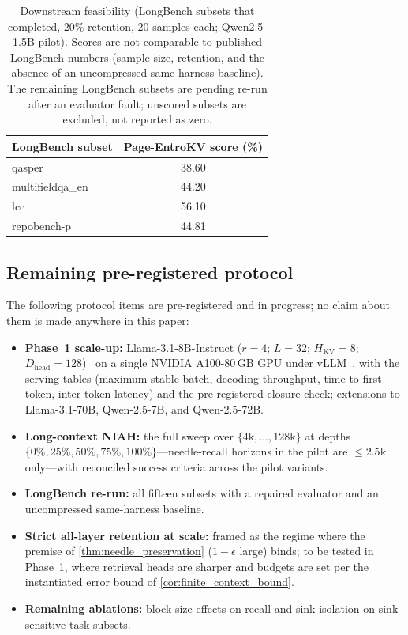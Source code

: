 \documentclass[final,5p,times,twocolumn]{elsarticle}
\theoremstyle{definition}
\theoremstyle{remark}
\newcommand{\method}{Page-EntroKV}
\newcommand{\HKV}{H_{\mathrm{KV}}}
\newcommand{\Dhead}{D_{\mathrm{head}}}
\begin{document}
\begin{table}[t]
\centering\small
\caption{Downstream feasibility (LongBench subsets that completed,
 $20\%$ retention, 20 samples each; Qwen2.5-1.5B pilot).
 Scores are not comparable to published LongBench numbers (sample size,
 retention, and the absence of an uncompressed same-harness baseline).
 The remaining LongBench subsets are pending re-run after an evaluator
 fault; unscored subsets are excluded, not reported as zero.}
\label{tab:pilot_downstream}
\begin{tabular}{@{}lc@{}}
\toprule
LongBench subset & \method{} score (\%) \\
\midrule
qasper          & 38.60 \\
multifieldqa\_en & 44.20 \\
lcc             & 56.10 \\
repobench-p     & 44.81 \\
\bottomrule
\end{tabular}
\end{table}

\subsection{Remaining pre-registered protocol}
\label{subsec:pilot-pending}

The following protocol items are pre-registered and in progress; no
claim about them is made anywhere in this paper:
\begin{itemize}
  \item \textbf{Phase~1 scale-up:} Llama-3.1-8B-Instruct ($r{=}4$;
   $L{=}32$; $\HKV{=}8$; $\Dhead{=}128$)~\cite{meta2024llama3} on a
   single NVIDIA A100-80\,GB GPU under
   vLLM~\cite{kwon2023vllm}, with the serving tables (maximum stable
   batch, decoding throughput, time-to-first-token, inter-token
   latency) and the pre-registered closure check; extensions to
   Llama-3.1-70B, Qwen-2.5-7B, and Qwen-2.5-72B.
  \item \textbf{Long-context NIAH:} the full sweep over
   $\{4\text{k},\dots,128\text{k}\}$ at depths
   $\{0\%,25\%,50\%,75\%,100\%\}$---needle-recall horizons in the pilot
   are $\le 2.5\text{k}$ only---with reconciled success criteria across
   the pilot variants.
  \item \textbf{LongBench re-run:} all fifteen subsets with a repaired
   evaluator and an uncompressed same-harness baseline.
  \item \textbf{Strict all-layer retention at scale:} framed as the
   regime where the premise of \cref{thm:needle_preservation}
   ($1-\epsilon$ large) binds; to be tested in Phase~1, where retrieval
   heads are sharper and budgets are set per the instantiated error
   bound of \cref{cor:finite_context_bound}.
  \item \textbf{Remaining ablations:} block-size effects on recall
   and sink isolation on sink-sensitive task subsets.
\end{itemize}
\end{document}
